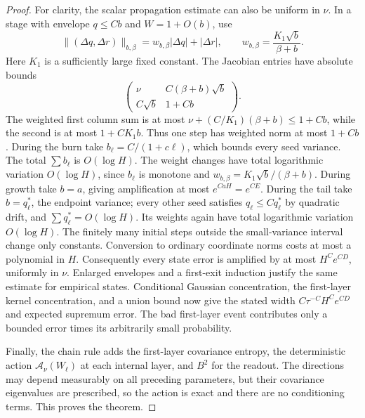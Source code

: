\begin{proof}
For clarity, the scalar propagation estimate can also be uniform in $\nu$. In a stage with envelope $q\le Cb$ and $W=1+O(b)$, use
\[
 \|(\Delta q,\Delta r)\|_{b,\beta}
 =w_{b,\beta}|\Delta q|+|\Delta r|,
 \qquad w_{b,\beta}=\frac{K_1\sqrt b}{\beta+b}.
\]
Here $K_1$ is a sufficiently large fixed constant. The Jacobian entries have absolute bounds
\[
 \begin{pmatrix}
 \nu & C(\beta+b)\sqrt b\\
 C\sqrt b & 1+Cb
 \end{pmatrix}.
\]
The weighted first column sum is at most
$\nu+(C/K_1)(\beta+b)\le1+Cb$, while the second is at most $1+CK_1b$. Thus one step has weighted norm at most $1+Cb$.
During the burn take $b_\ell=C/(1+c\ell)$, which bounds every seed variance. The total $\sum b_\ell$ is $O(\log H)$. The weight changes have total logarithmic variation $O(\log H)$, since $b_\ell$ is monotone and $w_{b,\beta}=K_1\sqrt b/(\beta+b)$. During growth take $b=a$, giving amplification at most $e^{CaH}=e^{CE}$. During the tail take $b=q_\ell^*$, the endpoint variance; every other seed satisfies $q_\ell\le Cq_\ell^*$ by quadratic drift, and $\sum q_\ell^*=O(\log H)$. Its weights again have total logarithmic variation $O(\log H)$. The finitely many initial steps outside the small-variance interval change only constants. Conversion to ordinary coordinate norms costs at most a polynomial in $H$.
Consequently every state error is amplified by at most $H^Ce^{CD}$, uniformly in $\nu$. Enlarged envelopes and a first-exit induction justify the same estimate for empirical states. Conditional Gaussian concentration, the first-layer kernel concentration, and a union bound now give the stated width $C\tau^{-C}H^Ce^{CD}$ and expected supremum error. The bad first-layer event contributes only a bounded error times its arbitrarily small probability.

Finally, the chain rule adds the first-layer covariance entropy, the deterministic action $\mathcal A_\nu(W_\ell)$ at each internal layer, and $B^2$ for the readout. The directions may depend measurably on all preceding parameters, but their covariance eigenvalues are prescribed, so the action is exact and there are no conditioning terms. This proves the theorem.
\end{proof}
